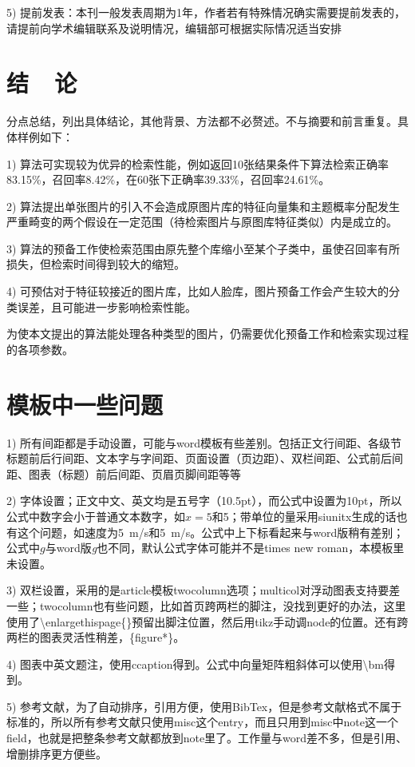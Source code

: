 \documentclass[10.5pt,twocolumn]{jbuaa}
\newcommand\mycolorRed[1]{{\color{red}#1}}
\begin{document}
5) 提前发表：本刊一般发表周期为1年，作者若有特殊情况确实需要提前发表的，请提前向学术编辑联系及说明情况，编辑部可根据实际情况适当安排

\section{结~~论}
分点总结，列出具体结论，其他背景、方法都不必赘述。不与摘要和前言重复。具体样例如下：

1) 算法可实现较为优异的检索性能，例如返回10张结果条件下算法检索正确率83.15\%，召回率8.42\%，在60张下正确率39.33\%，召回率24.61\%。

2) 算法提出单张图片的引入不会造成原图片库的特征向量集和主题概率分配发生严重畸变的两个假设在一定范围（待检索图片与原图库特征类似）内是成立的。

3) 算法的预备工作使检索范围由原先整个库缩小至某个子类中，虽使召回率有所损失，但检索时间得到较大的缩短。

4) 可预估对于特征较接近的图片库，比如人脸库，图片预备工作会产生较大的分类误差，且可能进一步影响检索性能。

为使本文提出的算法能处理各种类型的图片，仍需要优化预备工作和检索实现过程的各项参数。


\section{\mycolorRed{模板中一些问题}}

1) 所有\mycolorRed{间距}都是手动设置，可能与word模板有些差别。包括正文行间距、各级节标题前后行间距、文本字与字间距、页面设置（页边距）、双栏间距、公式前后间距、图表（标题）前后间距、页眉页脚间距等等

2) \mycolorRed{字体}设置；正文中文、英文均是五号字（10.5pt），而公式中设置为10pt，所以公式中数字会小于普通文本数字，如$x=5$和5；带单位的量采用siunitx生成的话也有这个问题，如速度为\SI{5}{m/s}和5\ m/s。公式中上下标看起来与word版稍有差别；公式中$g$与word版\textit{g}也不同，默认公式字体可能并不是times new roman，本模板里未设置。

3) \mycolorRed{双栏}设置，采用的是article模板twocolumn选项；multicol对浮动图表支持要差一些；twocolumn也有些问题，比如首页跨两栏的脚注，没找到更好的办法，这里使用了\textbackslash enlargethispage\{\}预留出脚注位置，然后用tikz手动调node的位置。还有跨两栏的图表灵活性稍差，\{figure*\}。

4) 图表中英文题注，使用ccaption得到。公式中向量矩阵粗斜体可以使用\textbackslash bm得到。

5) 参考文献，为了自动排序，引用方便，使用BibTex，但是参考文献格式不属于标准的，所以所有参考文献只使用misc这个entry，而且只用到misc中note这一个field，也就是把整条参考文献都放到note里了。工作量与word差不多，但是引用、增删排序更方便些。
\end{document}
